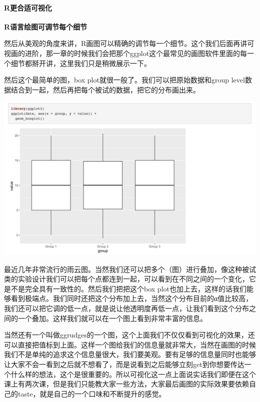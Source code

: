 \documentclass[
  oneside]{book}
\begin{document}
\hypertarget{rux66f4ux5408ux9002ux53efux89c6ux5316}{%
\paragraph{R更合适可视化}\label{rux66f4ux5408ux9002ux53efux89c6ux5316}}

\textbf{R语言绘图可调节每个细节}

然后从美观的角度来讲，R画图可以精确的调节每一个细节。这个我们后面再讲可视画的进阶，那一章的时候我们会把那个ggplot这个最常见的画图软件里面的每一个细节都掰开讲，这里我们只是稍微展示一下。

然后这个最简单的图，box plot就很一般了。我们可以把原始数据和group level数据结合到一起，然后再把每个被试的数据，把它的分布画出来。

\includegraphics{1001-lesson1/image-20230302201246104.png}

最近几年非常流行的雨云图。当然我们还可以把多个（图）进行叠加，像这种被试类的实验设计我们可以把每个点都连到一起，可以看到在不同之间的一个变化，它是不是完全具有一致性的。然后我们把把这个box plot也加上去，这样的话我们能够看到极端点。我们同时还把这个分布加上去，当然这个分布目前的α值比较高，我们还可以把它调的低一点，就是说让他透明度再低一点，让我们看到这个分布之间的一个叠加。这样我们就可以在一个图上看到非常丰富的信息。

当然还有一个叫做ggrudges的一个图，这个上面我们不仅仅看到可视化的效果，还可以直接把值标到上面。这样一个图给我们的信息量就非常大，当然在画图的时候我们不是单纯的追求这个信息量很大，我们要美观。要有足够的信息量同时也能够让大家不会一看到之后就不想看了，而是说看到之后能够立刻get到你想要传达一个什么样的想法，这个是很重要的。所以可视化这一点上面说实话我们即便在这个课上有两次课，但是我们只能教大家一些方法，大家最后画图的实际效果要依赖自己的taste，就是自己的一个口味和不断提升的感觉。
\end{document}
